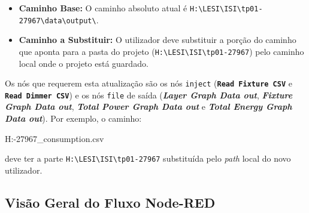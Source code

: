 \documentclass[a4paper, 12pt]{article}
\begin{document}
	\begin{itemize}
		\item \textbf{Caminho Base:} O caminho absoluto atual é \texttt{H:\textbackslash LESI\textbackslash ISI\textbackslash tp01-27967\textbackslash data\textbackslash output\textbackslash}.
		\item \textbf{Caminho a Substituir:} O utilizador deve substituir a porção do caminho que aponta para a pasta do projeto (\texttt{H:\textbackslash LESI\textbackslash ISI\textbackslash tp01-27967}) pelo caminho local onde o projeto está guardado.
	\end{itemize}
	
	Os nós que requerem esta atualização são os nós \texttt{inject} (\texttt{\textbf{Read Fixture CSV}} e \texttt{\textbf{Read Dimmer CSV}}) e os nós \texttt{file} de saída (\textit{\textbf{Layer Graph Data out}}, \textit{\textbf{Fixture Graph Data out}}, \textit{\textbf{Total Power Graph Data out}} e \textit{\textbf{Total Energy Graph Data out}}). Por exemplo, o caminho:
	\begin{KettleCode}
		H:\LESI\ISI{}-27967\data\output\fixture_consumption.csv
	\end{KettleCode}
	deve ter a parte \texttt{H:\textbackslash LESI\textbackslash ISI\textbackslash tp01-27967} substituída pelo \textit{path} local do novo utilizador.
	
	\subsection{Visão Geral do Fluxo Node-RED}
	
\end{document}
